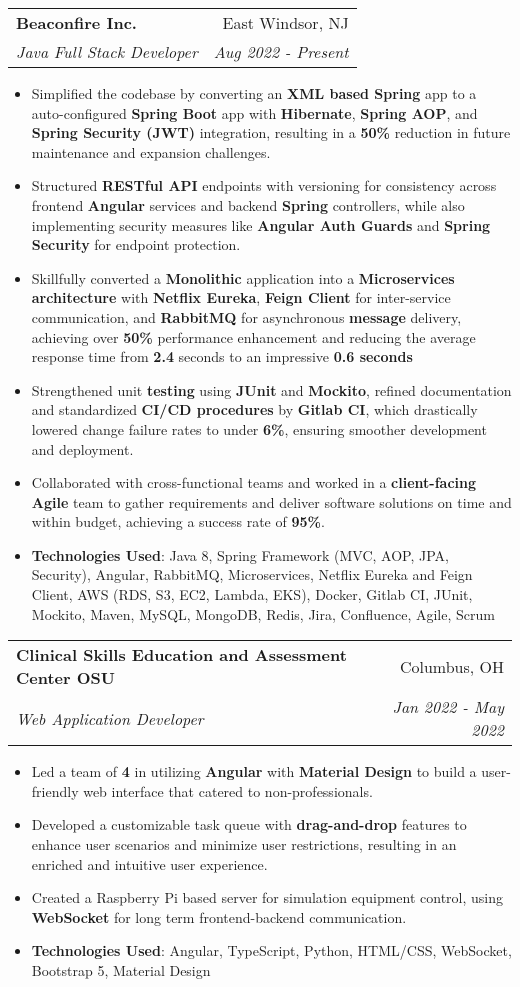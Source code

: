 \documentclass[letterpaper,11pt]{article}
\makeatletter
\newcommand{\resumeItem}[2]{
  \item\small{
    \textbf{#1}#2 \vspace{-2pt}
  }
}
\newcommand{\resumeSubheading}[4]{
  \vspace{-1pt}\item
    \begin{tabular*}{0.97\textwidth}[t]{l@{\extracolsep{\fill}}r}
      \textbf{#1} & #2 \\
      \textit{\small#3} & \textit{\small #4} \\
    \end{tabular*}\vspace{-5pt}
}
\newcommand{\resumeItemListStart}{\begin{itemize}}
\newcommand{\resumeItemListEnd}{\end{itemize}\vspace{-5pt}}
\makeatother
\begin{document}
    \resumeSubheading
    {Beaconfire Inc.}{East Windsor, NJ}
    {Java Full Stack Developer}{Aug 2022 - Present}
    \resumeItemListStart
      \resumeItem{}
        {Simplified the codebase by converting an \textbf{XML based Spring} app to a auto-configured \textbf{Spring Boot} app with \textbf{Hibernate}, \textbf{Spring AOP}, and \textbf{Spring Security (JWT)} integration, resulting in a \textbf{50\%} reduction in future maintenance and expansion challenges.}
      \resumeItem{}
        {Structured \textbf{RESTful API} endpoints with versioning for consistency across frontend \textbf{Angular} services and backend \textbf{Spring} controllers, while also implementing security measures like \textbf{Angular Auth Guards} and \textbf{Spring Security} for endpoint protection.}
      \resumeItem{}
        {Skillfully converted a \textbf{Monolithic} application into a \textbf{Microservices architecture} with \textbf{Netflix Eureka}, \textbf{Feign Client} for inter-service communication, and \textbf{RabbitMQ} for asynchronous \textbf{message} delivery, achieving over \textbf{50\%} performance enhancement and reducing the average response time from \textbf{2.4} seconds to an impressive \textbf{0.6 seconds}}
      \resumeItem{}
        {Strengthened unit \textbf{testing} using \textbf{JUnit} and \textbf{Mockito}, refined documentation and standardized \textbf{CI/CD procedures} by \textbf{Gitlab CI}, which drastically lowered change failure rates to under \textbf{6\%}, ensuring smoother development and deployment.}
      \resumeItem{}
        {Collaborated with cross-functional teams and worked in a \textbf{client-facing Agile} team to gather requirements and deliver software solutions on time and within budget, achieving a success rate of \textbf{95\%}.}
      \resumeItem{Technologies Used}
        {: Java 8, Spring Framework (MVC, AOP, JPA, Security), Angular, RabbitMQ, Microservices, Netflix Eureka and Feign Client, AWS (RDS, S3, EC2, Lambda, EKS), Docker, Gitlab CI, JUnit, Mockito, Maven, MySQL, MongoDB, Redis, Jira, Confluence, Agile, Scrum}
    \resumeItemListEnd

    \resumeSubheading
      {Clinical Skills Education and Assessment Center \textbar \thinspace \thinspace OSU}{Columbus, OH}
      {Web Application Developer}{Jan 2022 - May 2022}
      \resumeItemListStart
        \resumeItem{}
          {Led a team of \textbf{4} in utilizing \textbf{Angular} with \textbf{Material Design} to build a user-friendly web interface that catered to non-professionals.}
        \resumeItem{}
          {Developed a customizable task queue with \textbf{drag-and-drop} features to enhance user scenarios and minimize user restrictions, resulting in an enriched and intuitive user experience.}
        \resumeItem{}
          {Created a Raspberry Pi based server for simulation equipment control, using \textbf{WebSocket} for long term frontend-backend communication.}
        \resumeItem{Technologies Used}
          {: Angular, TypeScript, Python, HTML/CSS, WebSocket, Bootstrap 5, Material Design}
      \resumeItemListEnd
\end{document}

